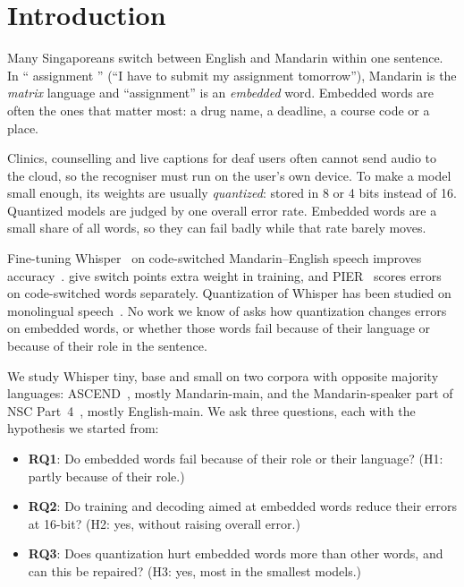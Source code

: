 \section{Introduction}
\label{sec:intro}

Many Singaporeans switch between English and Mandarin within one sentence. In `` assignment '' (``I have to submit my assignment tomorrow''), Mandarin is the \emph{matrix} language and ``assignment'' is an \emph{embedded} word. Embedded words are often the ones that matter most: a drug name, a deadline, a course code or a place.

Clinics, counselling and live captions for deaf users often cannot send audio to the cloud, so the recogniser must run on the user's own device. To make a model small enough, its weights are usually \emph{quantized}: stored in 8 or 4 bits instead of 16. Quantized models are judged by one overall error rate. Embedded words are a small share of all words, so they can fail badly while that rate barely moves.

Fine-tuning Whisper~\citep{radford2023whisper} on code-switched Mandarin--English speech improves accuracy~\citep{yang2024adapting,zhou2025csdialogue}. \citet{ugan2025adapting} give switch points extra weight in training, and PIER~\citep{ugan2025pier} scores errors on code-switched words separately. Quantization of Whisper has been studied on monolingual speech~\citep{sohler2026quantizing,ferraz2024efficient}. No work we know of asks how quantization changes errors on embedded words, or whether those words fail because of their language or because of their role in the sentence.

We study Whisper tiny, base and small on two corpora with opposite majority languages: ASCEND~\citep{lovenia2022ascend}, mostly Mandarin-main, and the Mandarin-speaker part of NSC Part~4~\citep{koh2019nsc}, mostly English-main. We ask three questions, each with the hypothesis we started from:
\begin{itemize}
  \item \textbf{RQ1}: Do embedded words fail because of their role or their language? (H1: partly because of their role.)
  \item \textbf{RQ2}: Do training and decoding aimed at embedded words reduce their errors at 16-bit? (H2: yes, without raising overall error.)
  \item \textbf{RQ3}: Does quantization hurt embedded words more than other words, and can this be repaired? (H3: yes, most in the smallest models.)
\end{itemize}

